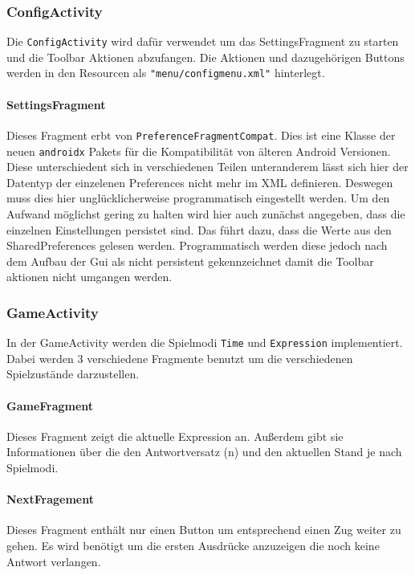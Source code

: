 \subsubsection{ConfigActivity}
Die \texttt{ConfigActivity} wird dafür verwendet um das SettingsFragment zu
starten und die Toolbar Aktionen abzufangen. Die Aktionen und dazugehörigen
Buttons werden in den Resourcen als \texttt{"menu/configmenu.xml"} hinterlegt.

\paragraph{SettingsFragment}
Dieses Fragment erbt von \texttt{PreferenceFragmentCompat}. Dies ist eine
Klasse der neuen \texttt{androidx} Pakets für die Kompatibilität von älteren
Android Versionen. Diese unterschiedent sich in verschiedenen Teilen
unteranderem lässt sich hier der Datentyp der einzelenen Preferences nicht
mehr im XML definieren. Deswegen muss dies hier unglücklicherweise
programmatisch eingestellt werden. Um den Aufwand möglichst gering zu halten
wird hier auch zunächst angegeben, dass die einzelnen Einstellungen persistet
sind. Das führt dazu, dass die Werte aus den SharedPreferences gelesen werden.
Programmatisch werden diese jedoch nach dem Aufbau der Gui als nicht
persistent gekennzeichnet damit die Toolbar aktionen nicht umgangen werden.

\subsubsection{GameActivity}
In der GameActivity werden die Spielmodi \texttt{Time} und \texttt{Expression}
implementiert. Dabei werden 3 verschiedene Fragmente benutzt um die verschiedenen
Spielzustände darzustellen.

\paragraph{GameFragment}
Dieses Fragment zeigt die aktuelle Expression an. Außerdem gibt sie Informationen
über die den Antwortversatz (n) und den aktuellen Stand je nach Spielmodi.

\paragraph{NextFragement}
Dieses Fragment enthält nur einen Button um entsprechend einen Zug weiter zu
gehen. Es wird benötigt um die ersten Ausdrücke anzuzeigen die noch keine
Antwort verlangen.

